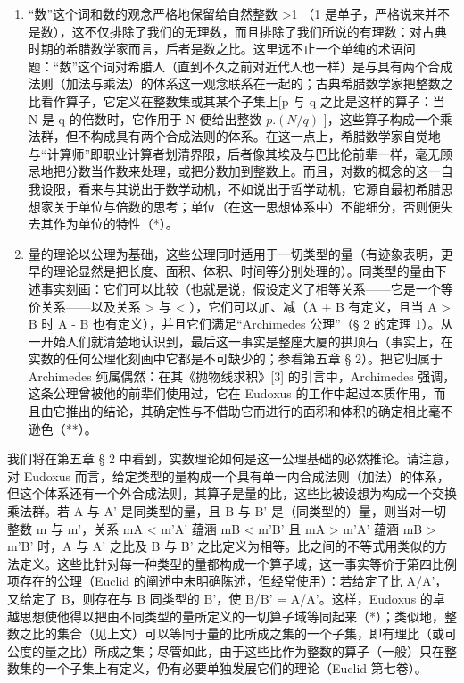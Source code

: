 \begin{enumerate}
\def\labelenumi{\arabic{enumi})}
\item
  “数”这个词和数的观念严格地保留给自然整数 \textgreater1 （1 是单子，严格说来并不是数），这不仅排除了我们的无理数，而且排除了我们所说的有理数：对古典时期的希腊数学家而言，后者是数之比。这里远不止一个单纯的术语问题：“数”这个词对希腊人（直到不久之前对近代人也一样）是与具有两个合成法则（加法与乘法）的体系这一观念联系在一起的；古典希腊数学家把整数之比看作算子，它定义在整数集或其某个子集上{[}p 与 q 之比是这样的算子：当 N 是 q 的倍数时，它作用于 N 便给出整数 \(p.(N/q)\) {]}，这些算子构成一个乘法群，但不构成具有两个合成法则的体系。在这一点上，希腊数学家自觉地与“计算师”即职业计算者划清界限，后者像其埃及与巴比伦前辈一样，毫无顾忌地把分数当作数来处理，或把分数加到整数上。而且，对数的概念的这一自我设限，看来与其说出于数学动机，不如说出于哲学动机，它源自最初希腊思想家关于单位与倍数的思考；单位（在这一思想体系中）不能细分，否则便失去其作为单位的特性（*）。
\item
  量的理论以公理为基础，这些公理同时适用于一切类型的量（有迹象表明，更早的理论显然是把长度、面积、体积、时间等分别处理的）。同类型的量由下述事实刻画：它们可以比较（也就是说，假设定义了相等关系——它是一个等价关系——以及关系 \textgreater{} 与 \textless{} ），它们可以加、减（A + B 有定义，且当 A \textgreater{} B 时 A - B 也有定义），并且它们满足“Archimedes 公理”（§ 2 的定理 1）。从一开始人们就清楚地认识到，最后这一事实是整座大厦的拱顶石（事实上，在实数的任何公理化刻画中它都是不可缺少的；参看第五章 § 2）。把它归属于 Archimedes 纯属偶然：在其《抛物线求积》{[}3{]} 的引言中，Archimedes 强调，这条公理曾被他的前辈们使用过，它在 Eudoxus 的工作中起过本质作用，而且由它推出的结论，其确定性与不借助它而进行的面积和体积的确定相比毫不逊色（**）。
\end{enumerate}

我们将在第五章 § 2 中看到，实数理论如何是这一公理基础的必然推论。请注意，对 Eudoxus 而言，给定类型的量构成一个具有单一内合成法则（加法）的体系，但这个体系还有一个外合成法则，其算子是量的比，这些比被设想为构成一个交换乘法群。若 A 与 A' 是同类型的量，且 B 与 B' 是（同类型的）量，则当对一切整数 m 与 m'，关系 mA \textless{} m'A' 蕴涵 mB \textless{} m'B' 且 mA \textgreater{} m'A' 蕴涵 mB \textgreater{} m'B' 时，A 与 A' 之比及 B 与 B' 之比定义为相等。比之间的不等式用类似的方法定义。这些比针对每一种类型的量都构成一个算子域，这一事实等价于第四比例项存在的公理（Euclid 的阐述中未明确陈述，但经常使用）：若给定了比 A/A'，又给定了 B，则存在与 B 同类型的 B'，使 B/B' = A/A'。这样，Eudoxus 的卓越思想使他得以把由不同类型的量所定义的一切算子域等同起来（*）；类似地，整数之比的集合（见上文）可以等同于量的比所成之集的一个子集，即有理比（或可公度的量之比）所成之集；尽管如此，由于这些比作为整数的算子（一般）只在整数集的一个子集上有定义，仍有必要单独发展它们的理论（Euclid 第七卷）。

